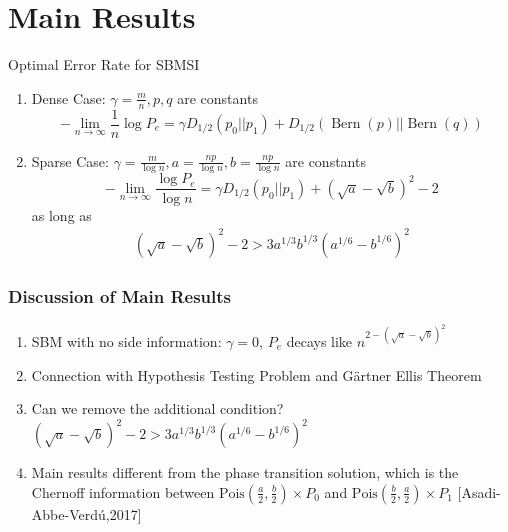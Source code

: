\documentclass{beamer}
\DeclareMathOperator{\Bern}{Bern}
\begin{document}
\section{Main Results}
\begin{frame}{Optimal Error Rate for SBMSI}
\begin{enumerate}
	\item Dense Case: $\gamma=\frac{m}{n}, p, q$ are constants
		\begin{equation*}
		-\lim_{n\to \infty} \frac{1}{n}\log P_e =  \gamma D_{1/2}(p_0 || p_1) + D_{1/2}(\Bern(p)||\Bern(q))
		\end{equation*}
	\item Sparse Case: $\gamma=\frac{m}{ \log n},
	a=\frac{np}{\log n}, b=\frac{np}{\log n}$ are constants
		\begin{equation*}\label{eq:PeMainL}
		-\lim_{n\to \infty}\frac{\log P_e}{\log n}=\gamma D_{1/2}(p_0||p_1) + (\sqrt{a} - \sqrt{b})^2-2
		\end{equation*}
		as long as
		\begin{align*}
			(\sqrt{a}-\sqrt{b})^2-2 
			> 3a^{1/3}b^{1/3}(a^{1/6}-b^{1/6})^2\label{eq:oneC}
		\end{align*}	
\end{enumerate}
\end{frame}
\begin{frame}
\frametitle{Discussion of Main Results}
\begin{enumerate}
	\item SBM with no side information: $\gamma = 0$, $P_e$ decays like $n^{2-(\sqrt{a} - \sqrt{b})^2}$
	\item Connection with Hypothesis Testing Problem and Gärtner Ellis Theorem
	\item Can we remove the additional condition?
	$(\sqrt{a}-\sqrt{b})^2-2 
	> 3a^{1/3}b^{1/3}(a^{1/6}-b^{1/6})^2$
	\item Main results different from the phase transition solution,
	which is the Chernoff information
	between $\textrm{Pois}(\frac{a}{2},\frac{b}{2})\times P_0$ and $\textrm{Pois}(\frac{b}{2}, \frac{a}{2})\times P_1$
	[Asadi-Abbe-Verdú,2017]
\end{enumerate}

\end{frame}
\end{document}

